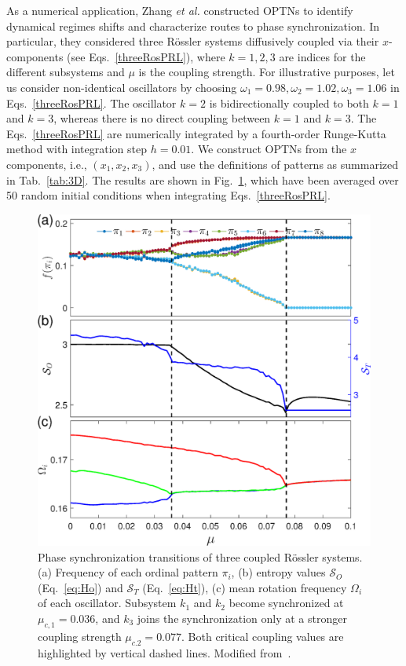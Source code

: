 As a numerical application, Zhang {\textit{et al.}} \cite{Zhang2017b} constructed OPTNs to identify dynamical regimes shifts and characterize routes to phase synchronization. In particular, they considered three R\"ossler systems diffusively coupled via their $x$-components \cite{Nawrath2010} (see Eqs.~\eqref{threeRosPRL}), where $k = 1, 2, 3$ are indices for the different subsystems and $\mu$ is the coupling strength. For illustrative purposes, let us consider non-identical oscillators by choosing $\omega_1 = 0.98, \omega_2 = 1.02, \omega_3 = 1.06$ in Eqs.~\eqref{threeRosPRL}. The oscillator $k = 2$ is bidirectionally coupled to both $k=1$ and $k=3$, whereas there is no direct coupling between $k=1$ and $k = 3$. The Eqs.~\eqref{threeRosPRL} are numerically integrated by a fourth-order Runge-Kutta method with integration step $h = 0.01$. We construct OPTNs from the $x$ components, i.e., $(x_1, x_2, x_3)$, and use the definitions of patterns as summarized in Tab.~\ref{tab:3D}. The results are shown in Fig.~\ref{fig:rosslerSync}, which have been averaged over 50 random initial conditions when integrating Eqs.~\eqref{threeRosPRL}. 
\begin{figure}
	\centering
	\includegraphics[width=0.6\columnwidth]{Chapter05_TransitionNt/rosslerSync.eps}
\caption{Phase synchronization transitions of three coupled R\"ossler systems. (a) Frequency of each ordinal pattern $\pi_i$, (b) entropy values $\mathcal{S}_O$ (Eq.~\eqref{eq:Ho}) and $\mathcal{S}_T$ (Eq.~\eqref{eq:Ht}), (c) mean rotation frequency $\Omega_i$ of each oscillator. Subsystem $k_1$ and $k_2$ become synchronized at $\mu_{c,1}=0.036$, and $k_3$ joins the synchronization only at a stronger coupling strength $\mu_{c.2}=0.077$. Both critical coupling values are highlighted by vertical dashed lines. Modified from~\cite{Zhang2017b}. \label{fig:rosslerSync}}
\end{figure}

